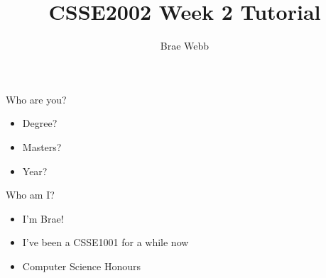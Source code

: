 \documentclass[week2]{csse2002}
\author{Brae Webb}
\title{CSSE2002 Week 2 Tutorial}
\begin{document}
\begin{frame}
\maketitle
\end{frame}

\begin{topic}{Who are you?}
\begin{itemize}
\item Degree?
\item Masters?
\item Year?
\end{itemize}
\end{topic}

\begin{topic}{Who am I?}
\begin{itemize}
\item I'm Brae!
\item I've been a CSSE1001 for a while now
\item Computer Science Honours
\end{itemize}
\end{topic}
\end{document}
